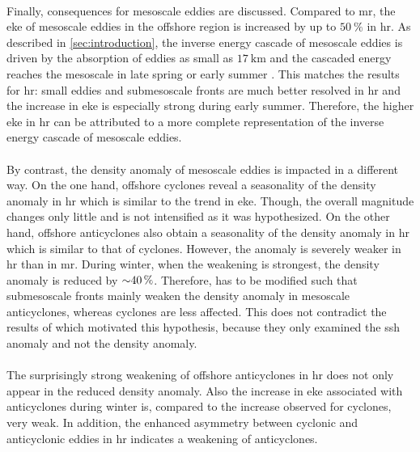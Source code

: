 \\
Finally, consequences for mesoscale eddies are discussed. Compared to \ac{mr}, the \ac{eke} of mesoscale eddies in the offshore region is increased by up to $\SI{50}{\percent}$ in \ac{hr}. As described in \autoref{sec:introduction}, the inverse energy cascade of mesoscale eddies is driven by the absorption of eddies as small as $\SI{17}{\kilo\metre}$ and the cascaded energy reaches the mesoscale in late spring or early summer \autocite{capet-2008-fronts3, schubert-2020-subm-energy-cascade}. This matches the results for \ac{hr}: small eddies and submesoscale fronts are much better resolved in \ac{hr} and the increase in \ac{eke} is especially strong during early summer. Therefore, the higher \ac{eke} in \ac{hr} can be attributed to a more complete representation of the inverse energy cascade of mesoscale eddies.\\
\\
By contrast, the density anomaly of mesoscale eddies is impacted in a different way. On the one hand, offshore cyclones reveal a seasonality of the density anomaly in \ac{hr} which is similar to the trend in \ac{eke}. Though, the overall magnitude changes only little and is not intensified as it was hypothesized. On the other hand, offshore anticyclones also obtain a seasonality of the density anomaly in \ac{hr} which is similar to that of cyclones. However, the anomaly is severely weaker in \ac{hr} than in \ac{mr}. During winter, when the weakening is strongest, the density anomaly is reduced by ${\sim} \SI{40}{\percent}$. Therefore,  has to be modified such that submesoscale fronts mainly weaken the density anomaly in mesoscale anticyclones, whereas cyclones are less affected. This does not contradict the results of \textcite{schubert-2019-agulhas} which motivated this hypothesis, because they only examined the \ac{ssh} anomaly and not the density anomaly.\\
\\
The surprisingly strong weakening of offshore anticyclones in \ac{hr} does not only appear in the reduced density anomaly. Also the increase in \ac{eke} associated with anticyclones during winter is, compared to the increase observed for cyclones, very weak. In addition, the enhanced asymmetry between cyclonic and anticyclonic eddies in \ac{hr} indicates a weakening of anticyclones.\\
